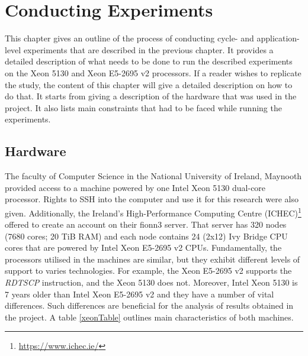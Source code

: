 
\chapter{Conducting Experiments} %
\label{chapterCondExp}


\ifpdf
    \graphicspath{{X/figures/PNG/}{X/figures/PDF/}{X/figures/}}
\else
    \graphicspath{{X/figures/EPS/}{X/figures/}}
\fi


This chapter gives an outline of the process of conducting cycle- and application-level experiments that are described in the previous chapter. It provides a detailed description of what needs to be done to run the described experiments on the Xeon 5130 and Xeon E5-2695 v2 processors. If a reader wishes to replicate the study, the content of this chapter will give a detailed description on how to do that. It starts from giving a description of the hardware that was used in the project. It also lists main constraints that had to be faced while running the experiments.

\section{Hardware}
\label{sec_hardware}

The faculty of Computer Science in the National University of Ireland, Maynooth provided access to a machine powered by one Intel Xeon 5130 dual-core processor. Rights to SSH into the computer and use it for this research were also given. Additionally, the Ireland's High-Performance Computing Centre (ICHEC)\footnote{\url{https://www.ichec.ie/}} offered to create an account on their fionn3 server. That server has 320 nodes (7680 cores; 20 TiB RAM) and each node contains 24 (2x12) Ivy Bridge CPU cores that are powered by Intel Xeon E5-2695 v2 CPUs. Fundamentally, the processors utilised in the machines are similar, but they exhibit different levels of support to varies technologies. For example, the Xeon E5-2695 v2 supports the \textit{RDTSCP} instruction, and the Xeon 5130 does not. Moreover, Intel Xeon 5130 is 7 years older than Intel Xeon E5-2695 v2 and they have a number of vital differences. Such differences are beneficial for the analysis of results obtained in the project. A table \ref{xeonTable} outlines main characteristics of both machines.

